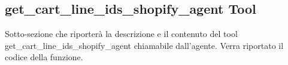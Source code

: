 \subsection{get\_cart\_line\_ids\_shopify\_agent Tool}

Sotto-sezione che riporterà la descrizione e il contenuto del tool get\_cart\_line\_ids\_shopify\_agent chiamabile dall'agente.
Verra riportato il codice della funzione.
